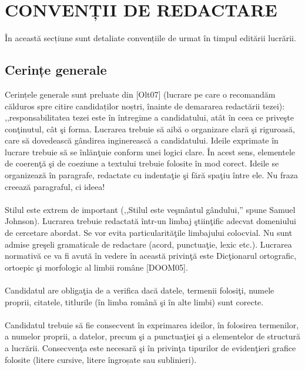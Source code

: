 \chapter{CONVENȚII DE REDACTARE}

În această secțiune sunt detaliate convențiile de urmat în timpul editării lucrării.

\section{Cerințe generale}

Cerințele generale sunt preluate din [Olt07] (lucrare pe care o recomandăm călduros spre citire candidaților 
noștri, înainte de demararea redactării tezei): ,,responsabilitatea tezei este în întregime a candidatului, atât 
în ceea ce priveşte conţinutul, cât şi forma. Lucrarea trebuie să aibă o organizare clară şi riguroasă, care să 
dovedească gândirea inginerească a candidatului. Ideile exprimate în lucrare trebuie să se înlănţuie conform unei 
logici clare. În acest sens, elementele de coerenţă şi de coeziune a textului trebuie folosite în mod corect. Ideile 
se organizează în paragrafe, redactate cu indentaţie şi fără spaţiu între ele. Nu fraza creează paragraful, ci ideea!\\~\\

Stilul este extrem de important (,,Stilul este veşmântul gândului,'' spune Samuel Johnson). Lucrarea trebuie redactată 
într-un limbaj ştiinţific adecvat domeniului de cercetare abordat. Se vor evita particularităţile limbajului colocvial. 
Nu sunt admise greşeli gramaticale de redactare (acord, punctuaţie, lexic etc.). Lucrarea normativă ce va fi avută în vedere 
în această privinţă este Dicţionarul ortografic, ortoepic şi morfologic al limbii române [DOOM05].\\~\\

Candidatul are obligaţia de a verifica dacă datele, termenii folosiţi, numele proprii, citatele, titlurile (în limba 
română şi în alte limbi) sunt corecte. \\~\\

Candidatul trebuie să fie consecvent în exprimarea ideilor, în folosirea termenilor, a numelor proprii, a datelor, precum 
şi a punctuaţiei şi a elementelor de structură a lucrării. Consecvenţa este necesară şi în privinţa tipurilor de evidenţieri 
grafice folosite (litere cursive, litere îngroșate sau sublinieri).\\~\\

